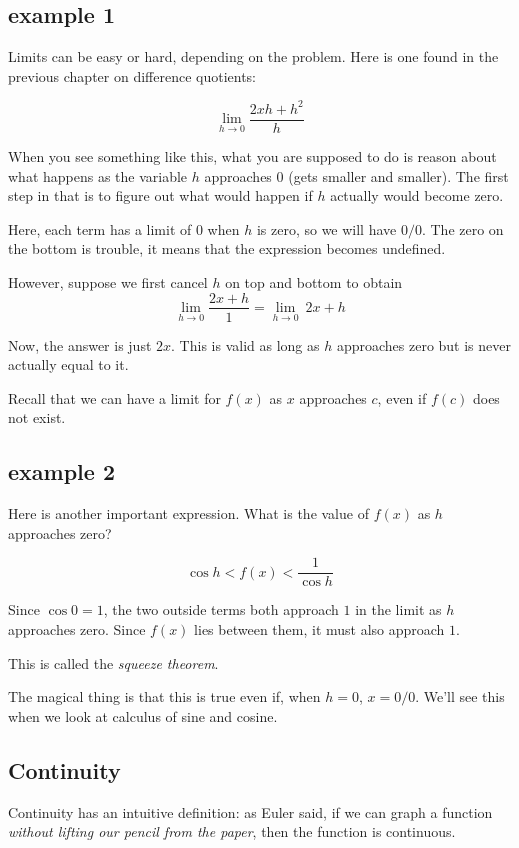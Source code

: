 \documentclass[11pt, oneside]{article}
\begin{document}
\subsection*{example 1}

Limits can be easy or hard, depending on the problem.  Here is one found in the previous chapter on difference quotients:

\[ \lim_{h \rightarrow 0} \frac{2xh + h^2}{h} \]

When you see something like this, what you are supposed to do is reason about what happens as the variable $h$ approaches $0$ (gets smaller and smaller).  The first step in that is to figure out what would happen if $h$ actually would become zero.

Here, each term has a limit of $0$ when $h$ is zero, so we will have $0/0$.  The zero on the bottom is trouble, it means that the expression becomes undefined.

However, suppose we first cancel $h$ on top and bottom to obtain
\[ \lim_{h \rightarrow 0} \frac{2x + h}{1} = \lim_{h \rightarrow 0} \ 2x + h \]

Now, the answer is just $2x$.  This is valid as long as $h$ approaches zero but is never actually equal to it.  

Recall that we can have a limit for $f(x)$ as $x$ approaches $c$, even if $f(c)$ does not exist.

\subsection*{example 2}

Here is another important expression.  What is the value of $f(x)$ as $h$ approaches zero?

\[ \cos h < f(x) < \frac{1}{\cos h}  \]

Since $\cos 0 = 1$, the two outside terms both approach $1$ in the limit as $h$ approaches zero.  Since $f(x)$ lies between them, it must also approach $1$.

This is called the \emph{squeeze theorem}.

The magical thing is that this is true even if, when $h = 0$, $x = 0/0$.  We'll see this when we look at calculus of sine and cosine.

\subsection*{Continuity}

Continuity has an intuitive definition:  as Euler said, if we can graph a function \emph{without lifting our pencil from the paper}, then the function is continuous.
\end{document}
